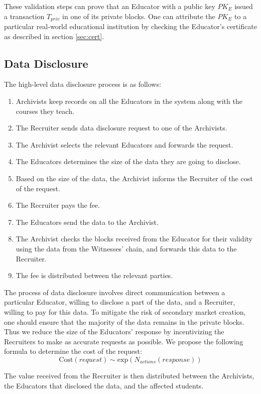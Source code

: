 These validation steps can prove that an Educator with a public key $PK_E$ issued a transaction $T_{priv}$ in one of its private blocks. One can attribute the $PK_E$ to a particular real-world educational institution by checking the Educator's certificate as described in section \ref{sec:cert}.

\subsection{Data Disclosure}
\label{sec:DataDisclosure}

The high-level data disclosure process is as follows:
\begin{enumerate}
\item Archivists keep records on all the Educators in the system along with the courses they teach.
\item The Recruiter sends data disclosure request to one of the Archivists.
\item The Archivist selects the relevant Educators and forwards the request.
\item The Educators determines the size of the data they are going to disclose.
\item Based on the size of the data, the Archivist informs the Recruiter of the cost of the request.
\item The Recruiter pays the fee.
\item The Educators send the data to the Archivist.
\item The Archivist checks the blocks received from the Educator for their validity using the data from the Witnesses' chain, and forwards this data to the Recruiter.
\item The fee is distributed between the relevant parties.
\end{enumerate}

The process of data disclosure involves direct communication between a particular Educator, willing to disclose a part of the data, and a Recruiter, willing to pay for this data. To mitigate the risk of secondary market creation, one should ensure that the majority of the data remains in the private blocks. Thus we reduce the size of the Educators' response by incentivizing the Recruiters to make as accurate requests as possible. We propose the following formula to determine the cost of the request:
\begin{equation}
\mathrm{Cost}(request) \sim \mathrm{exp}(N_{actions}(response))
\end{equation}

The value received from the Recruiter is then distributed between the Archivists, the Educators that disclosed the data, and the affected students.